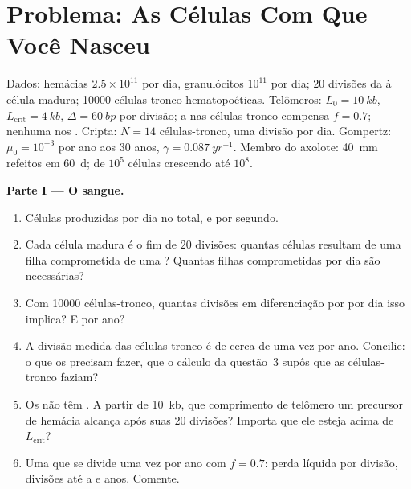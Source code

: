 \section{Problema: As Células Com Que Você Nasceu}

\begin{problem}
\label{pb:b3:stem-cells:1}
Dados: hemácias $2.5\times 10^{11}$ por dia, granulócitos $10^{11}$ por
dia; $20$ divisões da  à célula madura; \num{10000}
células-tronco hematopoéticas. Telômeros: $L_{0} = \qty{10}{kb}$,
$L_{\text{crit}} = \qty{4}{kb}$, $\Delta = \qty{60}{bp}$ por divisão; a
 nas células-tronco compensa $f = 0.7$; nenhuma nos
. Cripta: $N = 14$ células-tronco, uma divisão por dia.
Gompertz: $\mu_{0} =
10^{-3}$ por ano aos 30 anos, $\gamma = \qty{0.087}{yr^{-1}}$. Membro do axolote: \qty{40}{mm} refeitos em
\qty{60}{d};  de $10^{5}$ células crescendo até $10^{8}$.

\medskip
\noindent\textbf{Parte I --- O sangue.}
\begin{enumerate}
  \item Células produzidas por dia no total, e por segundo.
  \item Cada célula madura é o fim de $20$ divisões: quantas células
        resultam de uma filha comprometida de uma ? Quantas
        filhas comprometidas por dia são necessárias?
  \item Com \num{10000} células-tronco, quantas divisões em diferenciação
        por  por dia isso implica? E por ano?
  \item A divisão medida das células-tronco é de cerca de uma vez por
        ano. Concilie: o que os  precisam fazer, que o
        cálculo da questão~3 supôs que as células-tronco faziam?
  \item Os  não têm . A partir de \qty{10}{kb}, que
        comprimento de telômero um precursor de hemácia alcança após suas
        $20$ divisões? Importa que ele esteja acima de $L_{\text{crit}}$?
  \item Uma  que se divide uma vez por ano com $f = 0.7$:
        perda líquida por divisão, divisões até a  e anos.
        Comente.
\end{enumerate}


\end{problem}
